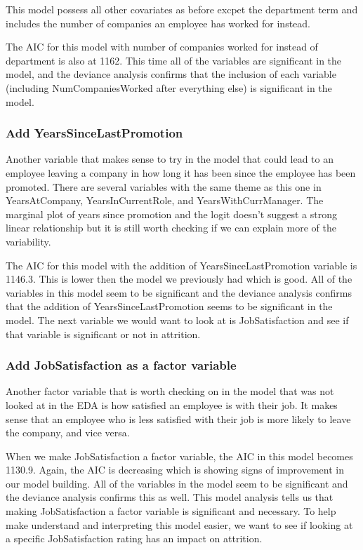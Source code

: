 \documentclass[]{article}
\begin{document}
This model possess all other covariates as before excpet the department
term and includes the number of companies an employee has worked for
instead.

The AIC for this model with number of companies worked for instead of
department is also at 1162. This time all of the variables are
significant in the model, and the deviance analysis confirms that the
inclusion of each variable (including NumCompaniesWorked after
everything else) is significant in the model.

\hypertarget{add-yearssincelastpromotion}{%
\subsubsection{Add
YearsSinceLastPromotion}\label{add-yearssincelastpromotion}}

Another variable that makes sense to try in the model that could lead to
an employee leaving a company in how long it has been since the employee
has been promoted. There are several variables with the same theme as
this one in YearsAtCompany, YearsInCurrentRole, and
YearsWithCurrManager. The marginal plot of years since promotion and the
logit doesn't suggest a strong linear relationship but it is still worth
checking if we can explain more of the variability.

The AIC for this model with the addition of YearsSinceLastPromotion
variable is 1146.3. This is lower then the model we previously had which
is good. All of the variables in this model seem to be significant and
the deviance analysis confirms that the addition of
YearsSinceLastPromotion seems to be significant in the model. The next
variable we would want to look at is JobSatisfaction and see if that
variable is significant or not in attrition.

\hypertarget{add-jobsatisfaction-as-a-factor-variable}{%
\subsubsection{Add JobSatisfaction as a factor
variable}\label{add-jobsatisfaction-as-a-factor-variable}}

Another factor variable that is worth checking on in the model that was
not looked at in the EDA is how satisfied an employee is with their job.
It makes sense that an employee who is less satisfied with their job is
more likely to leave the company, and vice versa.

When we make JobSatisfaction a factor variable, the AIC in this model
becomes 1130.9. Again, the AIC is decreasing which is showing signs of
improvement in our model building. All of the variables in the model
seem to be significant and the deviance analysis confirms this as well.
This model analysis tells us that making JobSatisfaction a factor
variable is significant and necessary. To help make understand and
interpreting this model easier, we want to see if looking at a specific
JobSatisfaction rating has an impact on attrition.
\end{document}
